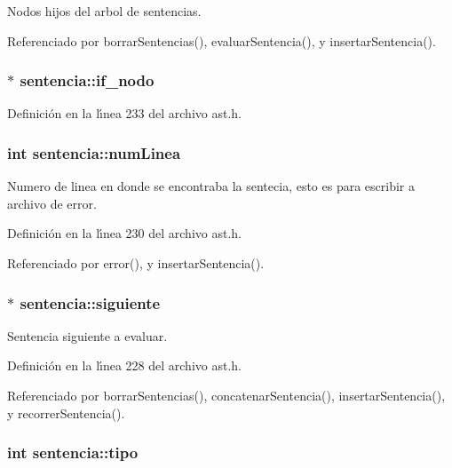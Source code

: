 Nodos hijos del arbol de sentencias. 



Referenciado por borrar\-Sentencias(), evaluar\-Sentencia(), y insertar\-Sentencia().
\subsubsection{$\ast$ {\bf sentencia::if\_\-nodo}}\label{structsentencia_o3}




Definici\'{o}n en la l\'{\i}nea 233 del archivo ast.h.
\subsubsection{\setlength{\rightskip}{0pt plus 5cm}int {\bf sentencia::num\-Linea}}\label{structsentencia_o2}


Numero de linea en donde se encontraba la sentecia, esto es para escribir a archivo de error. 



Definici\'{o}n en la l\'{\i}nea 230 del archivo ast.h.

Referenciado por error(), y insertar\-Sentencia().
\subsubsection{$\ast$ {\bf sentencia::siguiente}}\label{structsentencia_o0}


Sentencia siguiente a evaluar. 



Definici\'{o}n en la l\'{\i}nea 228 del archivo ast.h.

Referenciado por borrar\-Sentencias(), concatenar\-Sentencia(), insertar\-Sentencia(), y recorrer\-Sentencia().
\subsubsection{\setlength{\rightskip}{0pt plus 5cm}int {\bf sentencia::tipo}}\label{structsentencia_o1}


